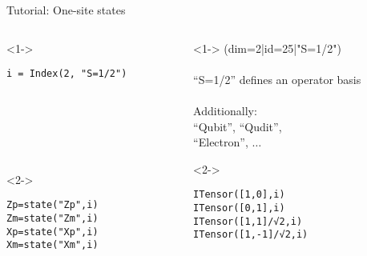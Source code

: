 \begin{frame}[fragile]{Tutorial: One-site states}

\begin{columns}

\begin{column}{4.5cm}

\begin{onlyenv}<1->
  \begin{lstlisting}[language=JuliaLocal, style=julia, basicstyle=\scriptsize\ttfamily]
  i = Index(2, "S=1/2")







  \end{lstlisting}
\end{onlyenv}

\begin{onlyenv}<2->
\begin{lstlisting}[language=JuliaLocal, style=julia, basicstyle=\scriptsize\ttfamily]
Zp=state("Zp",i)
Zm=state("Zm",i)
Xp=state("Xp",i)
Xm=state("Xm",i)
\end{lstlisting}
\end{onlyenv}

\end{column}

\begin{column}{5cm}

\begin{onlyenv}<1->
(dim=2|id=25|"S=1/2") \\
~\\
``S=1/2'' defines an operator basis \\
~\\
Additionally:\\
``Qubit'', ``Qudit'',\\
``Electron'', $\dots$
\end{onlyenv}

\begin{onlyenv}<2->
\vspace*{0.2cm}
~\\
\begin{lstlisting}[language=JuliaLocal, mathescape, style=julia, basicstyle=\scriptsize\ttfamily]
ITensor([1,0],i)
ITensor([0,1],i)
ITensor([1,1]/√2,i)
ITensor([1,-1]/√2,i)
\end{lstlisting}
\end{onlyenv}

\end{column}

\end{columns}

\end{frame}
